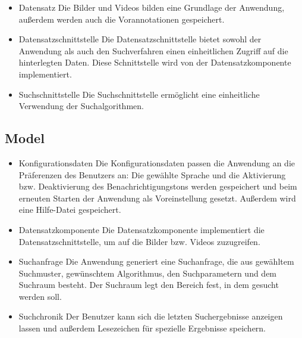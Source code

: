\begin{itemize}
\item Datensatz\newline
Die Bilder und Videos bilden eine Grundlage der Anwendung, außerdem werden auch die Vorannotationen gespeichert.
\item Datensatzschnittstelle\newline
Die Datensatzschnittstelle bietet sowohl der Anwendung als auch den Suchverfahren einen einheitlichen Zugriff auf die hinterlegten Daten. Diese Schnittstelle wird von der Datensatzkomponente implementiert.
\item Suchschnittstelle\newline
Die Suchschnittstelle ermöglicht eine einheitliche Verwendung der Suchalgorithmen.
\end{itemize}

\subsection{Model}
\begin{itemize}
\item Konfigurationsdaten\newline
Die Konfigurationsdaten passen die Anwendung an die Präferenzen des Benutzers an: Die gewählte Sprache und die Aktivierung bzw. Deaktivierung des Benachrichtigungstons werden gespeichert und beim erneuten Starten der Anwendung als Voreinstellung gesetzt. Außerdem wird eine Hilfe-Datei gespeichert.
\item Datensatzkomponente\newline
Die Datensatzkomponente implementiert die Datensatzschnittstelle, um auf die Bilder bzw. Videos zuzugreifen.
\item Suchanfrage\newline
Die Anwendung generiert eine Suchanfrage, die aus gewähltem Suchmuster, gewünschtem Algorithmus, den Suchparametern und dem Suchraum besteht. Der Suchraum legt den Bereich fest, in dem gesucht werden soll.
\item Suchchronik\newline
Der Benutzer kann sich die letzten Suchergebnisse anzeigen lassen und außerdem Lesezeichen für spezielle Ergebnisse speichern.
\end{itemize}
\pagebreak

